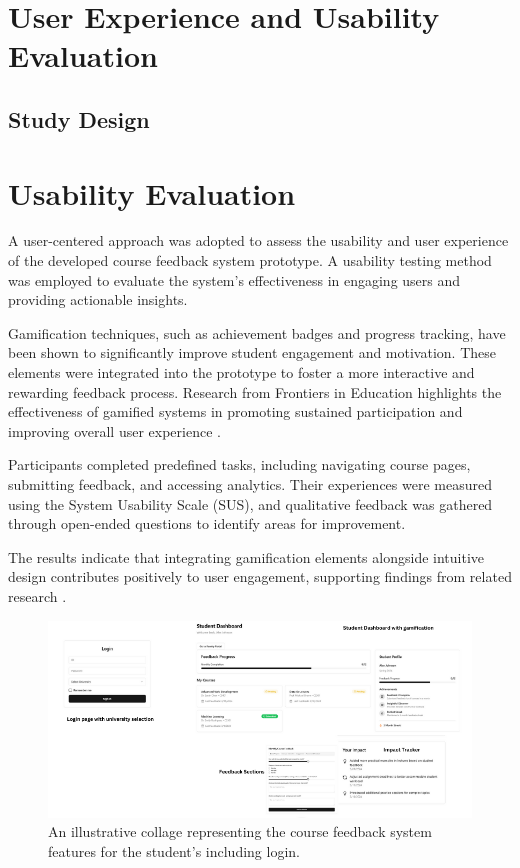 \documentclass[conference]{IEEEtran}
\begin{document}
\section{User Experience and Usability Evaluation}
\subsection{Study Design}

\section{Usability Evaluation}

A user-centered approach was adopted to assess the usability and user experience of the developed course feedback system prototype. A usability testing method was employed to evaluate the system's effectiveness in engaging users and providing actionable insights.

Gamification techniques, such as achievement badges and progress tracking, have been shown to significantly improve student engagement and motivation. These elements were integrated into the prototype to foster a more interactive and rewarding feedback process. Research from Frontiers in Education highlights the effectiveness of gamified systems in promoting sustained participation and improving overall user experience \cite{10.3389/feduc.2024.1466926}.

Participants completed predefined tasks, including navigating course pages, submitting feedback, and accessing analytics. Their experiences were measured using the System Usability Scale (SUS), and qualitative feedback was gathered through open-ended questions to identify areas for improvement.

The results indicate that integrating gamification elements alongside intuitive design contributes positively to user engagement, supporting findings from related research \cite{10.3389/feduc.2024.1466926}.

\begin{figure}[!h]
    \centering
    \includegraphics[width=\linewidth]{features.png}
    \caption{An illustrative collage representing the course feedback system features for the student's including login.}
    \label{fig:student_features}
    \end{figure}
\end{document}
